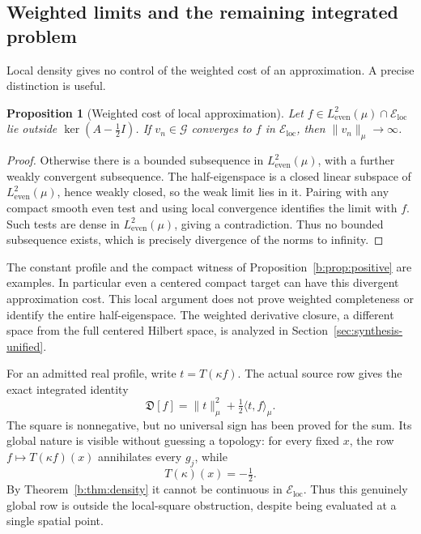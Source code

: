 \documentclass[11pt,a4paper]{article}
\numberwithin{equation}{section}
\newtheorem{proposition}[theorem]{Proposition}
\theoremstyle{definition}\newtheorem{definition}[theorem]{Definition}
\theoremstyle{remark}\newtheorem{remark}[theorem]{Remark}
\newcommand{\He}{L^2_{\mathrm{even}}(\mu)}\newcommand{\Le}{L^2_{\mathrm{even}}(dx)}
\newcommand{\ip}[2]{\langle#1,#2\rangle}\newcommand{\norm}[1]{\lVert#1\rVert}\newcommand{\abs}[1]{\lvert#1\rvert}
\newcommand{\Eloc}{\mathcal E_{\mathrm{loc}}}\newcommand{\Def}{\mathfrak D}
\begin{document}
\subsection{Weighted limits and the remaining integrated problem}\label{b:sec:scope}

Local density gives no control of the weighted cost of an approximation. A precise distinction is useful.

\begin{proposition}[Weighted cost of local approximation]\label{b:prop:blowup}
Let $f\in\He\cap\Eloc$ lie outside $\ker(A-\tfrac12I)$. If $v_n\in\mathcal G$ converges to $f$ in $\Eloc$, then $\norm{v_n}_\mu\to\infty$.
\end{proposition}
\begin{proof}
Otherwise there is a bounded subsequence in $\He$, with a further weakly convergent subsequence. The half-eigenspace is a closed linear subspace of $\He$, hence weakly closed, so the weak limit lies in it. Pairing with any compact smooth even test and using local convergence identifies the limit with $f$. Such tests are dense in $\He$, giving a contradiction. Thus no bounded subsequence exists, which is precisely divergence of the norms to infinity.
\end{proof}

The constant profile and the compact witness of Proposition~\ref{b:prop:positive} are examples. In particular even a centered compact target can have this divergent approximation cost. This local argument does not prove weighted completeness or identify the entire half-eigenspace. The weighted derivative closure, a different space from the full centered Hilbert space, is analyzed in Section~\ref{sec:synthesis-unified}.

For an admitted real profile, write $t=T(\kappa f)$. The actual source row gives the exact integrated identity
\begin{equation}\label{b:eq:signedsource-defect}
 \Def[f]=\norm t_\mu^2+\tfrac12\ip t f_\mu.
\end{equation}
The square is nonnegative, but no universal sign has been proved for the sum. Its global nature is visible without guessing a topology: for every fixed $x$, the row $f\mapsto T(\kappa f)(x)$ annihilates every $g_j$, while
\[
 T(\kappa)(x)=-\tfrac12.
\]
By Theorem~\ref{b:thm:density} it cannot be continuous in $\Eloc$. Thus this genuinely global row is outside the local-square obstruction, despite being evaluated at a single spatial point.
\end{document}
